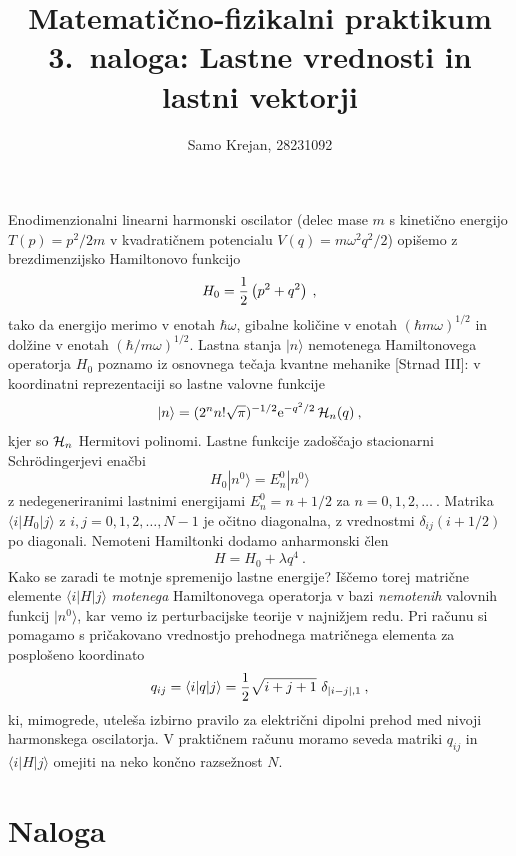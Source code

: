 \documentclass[slovene,11pt,a4paper]{article}
\title{
\sc\large Matematično-fizikalni praktikum \thisyear\\
\bigskip
\bf\Large 3.~naloga: Lastne vrednosti in lastni vektorji
}
\author{Samo Krejan, 28231092}
\date{}
\begin{document}
\maketitle

Enodimenzionalni linearni harmonski oscilator (delec mase $m$
s kinetično energijo $T(p)=p^2/2m$ v kvadratičnem potencialu
$V(q)=m\omega^2 q^2/2$) opišemo z brezdimenzijsko Hamiltonovo funkcijo
\begin{equation*}
  H_0 = {1\over 2} \left( p^2 + q^2 \right) \>,
\end{equation*}
tako da energijo merimo v enotah $\hbar\omega$, gibalne količine
v enotah $(\hbar m\omega)^{1/2}$ in dolžine v enotah $(\hbar/m\omega)^{1/2}$.
Lastna stanja $|n\rangle$ nemotenega Hamiltonovega operatorja $H_0$
poznamo iz osnovnega tečaja kvantne mehanike [Strnad III]:
v koordinatni reprezentaciji so lastne valovne funkcije
\begin{equation*}
  |n\rangle = (2^n n! \sqrt{\pi})^{-1/2} \mathrm{e}^{-q^2/2}\,  {\cal H}_n (q)\>,
\end{equation*}
kjer so ${\cal H}_n$ Hermitovi polinomi.
Lastne funkcije zadoščajo stacionarni Schr\"odingerjevi enačbi
\begin{equation*}
H_0 | n^0 \rangle = E_n^0 | n^0 \rangle
\end{equation*}
z nedegeneriranimi lastnimi energijami $E_n^0 = n + 1/2$
za $n=0,1,2,\ldots~$.  Matrika $\langle i | H_0 | j\rangle$
z $i,j=0,1,2,\ldots,N-1$ je očitno diagonalna, z vrednostmi
$\delta_{ij}(i + 1/2)$ po diagonali.  Nemoteni Hamiltonki
dodamo anharmonski člen
\begin{equation*}
H = H_0 + \lambda q^4 \>.
\end{equation*}
Kako se zaradi te motnje spremenijo lastne energije?
Iščemo torej matrične elemente $\langle i | H | j\rangle$
{\sl motenega\/} Hamiltonovega operatorja v bazi {\sl nemotenih\/}
valovnih funkcij $| n^0\rangle$, kar vemo iz perturbacijske
teorije v najnižjem redu.  Pri računu si pomagamo
s pričakovano vrednostjo prehodnega matričnega
elementa za posplošeno koordinato
$$
q_{ij} = \langle i | q | j \rangle
       = {1\over 2} \sqrt{i+j+1}\,\, \delta_{|i-j|,1} \>,
$$
ki, mimogrede, uteleša izbirno pravilo za električni dipolni
prehod med nivoji harmonskega oscilatorja.  V praktičnem računu
moramo seveda matriki $q_{ij}$ in $\langle i | H | j\rangle$
omejiti na neko končno razsežnost $N$.

\section{Naloga}
\end{document}
